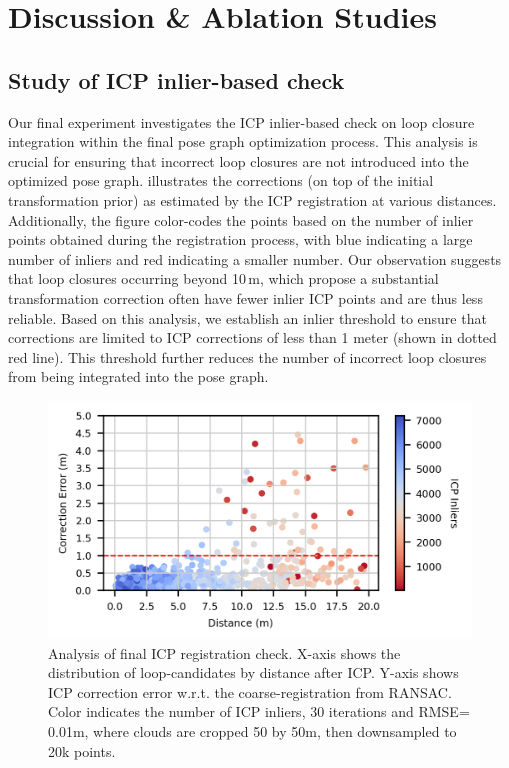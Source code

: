 \section{Discussion \& Ablation Studies}

\subsection*{Study of ICP inlier-based check}
\label{sec:exp_icp_ablation}
Our final experiment investigates the ICP inlier-based check on loop closure integration within the final pose graph optimization process. This analysis is crucial for ensuring that incorrect loop closures are not introduced into the optimized pose graph.
 illustrates the corrections (on top of the initial transformation prior) as estimated by the ICP registration at various distances. Additionally, the figure color-codes the points based on the number of inlier points obtained during the registration process, with blue indicating a large number of inliers and red indicating a smaller number.
Our observation suggests that loop closures occurring beyond 10\,m, which propose a substantial transformation correction often have fewer inlier ICP points and are thus less reliable.
Based on this analysis, we establish an inlier threshold to ensure that corrections are limited to ICP corrections of less than 1 meter (shown in dotted red line). This threshold further reduces the number of incorrect loop closures from being integrated into the pose graph.
\begin{figure}[t]
  \centering
  \includegraphics[width=0.99\linewidth]{pics/exp_4_ablation_icp_inliers_4cm}
  \caption{Analysis of final ICP registration check. X-axis shows the distribution of loop-candidates by distance after ICP.
  Y-axis shows ICP correction error w.r.t. the coarse-registration from RANSAC. Color indicates the number of ICP inliers,  30 iterations and RMSE= 0.01m, where clouds are cropped 50 by 50m, then downsampled to 20k points.}
  \label{fig:icp_inliers}
\end{figure}
